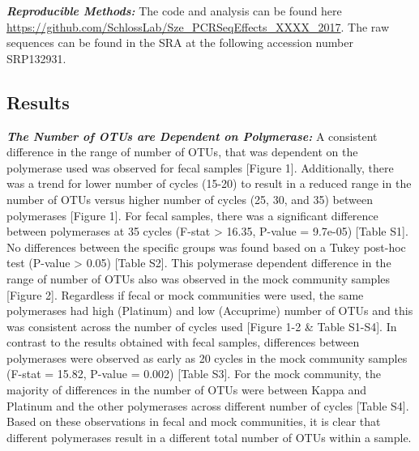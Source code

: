 \documentclass[12pt,]{article}
\begin{document}
\textbf{\emph{Reproducible Methods:}} The code and analysis can be found
here \url{https://github.com/SchlossLab/Sze_PCRSeqEffects_XXXX_2017}.
The raw sequences can be found in the SRA at the following accession
number SRP132931.

\newpage

\subsection{Results}\label{results}

\textbf{\emph{The Number of OTUs are Dependent on Polymerase:}} A
consistent difference in the range of number of OTUs, that was dependent
on the polymerase used was observed for fecal samples {[}Figure 1{]}.
Additionally, there was a trend for lower number of cycles (15-20) to
result in a reduced range in the number of OTUs versus higher number of
cycles (25, 30, and 35) between polymerases {[}Figure 1{]}. For fecal
samples, there was a significant difference between polymerases at 35
cycles (F-stat \textgreater{} 16.35, P-value = 9.7e-05) {[}Table S1{]}.
No differences between the specific groups was found based on a Tukey
post-hoc test (P-value \textgreater{} 0.05) {[}Table S2{]}. This
polymerase dependent difference in the range of number of OTUs also was
observed in the mock community samples {[}Figure 2{]}. Regardless if
fecal or mock communities were used, the same polymerases had high
(Platinum) and low (Accuprime) number of OTUs and this was consistent
across the number of cycles used {[}Figure 1-2 \& Table S1-S4{]}. In
contrast to the results obtained with fecal samples, differences between
polymerases were observed as early as 20 cycles in the mock community
samples (F-stat = 15.82, P-value = 0.002) {[}Table S3{]}. For the mock
community, the majority of differences in the number of OTUs were
between Kappa and Platinum and the other polymerases across different
number of cycles {[}Table S4{]}. Based on these observations in fecal
and mock communities, it is clear that different polymerases result in a
different total number of OTUs within a sample.
\end{document}
